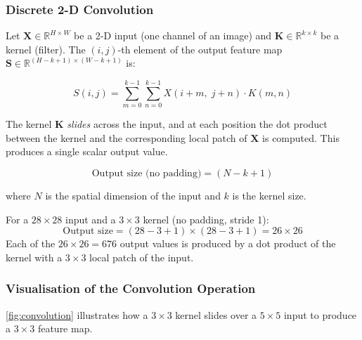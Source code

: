 \documentclass[12pt,a4paper]{article}
\begin{document}
\subsubsection{Discrete 2-D Convolution}
\label{sec:cnn_intro:convolution:math}

Let $\mathbf{X} \in \mathbb{R}^{H \times W}$ be a 2-D input (one channel
of an image) and $\mathbf{K} \in \mathbb{R}^{k \times k}$ be a kernel (filter).
The $(i,j)$-th element of the output feature map
$\mathbf{S} \in \mathbb{R}^{(H-k+1)\times(W-k+1)}$ is:

\begin{equation}
  \label{eq:convolution}
  S(i,j) = \sum_{m=0}^{k-1} \sum_{n=0}^{k-1} X(i+m,\; j+n) \cdot K(m,n)
\end{equation}

The kernel $\mathbf{K}$ \emph{slides} across the input, and at each
position the dot product between the kernel and the corresponding local
patch of $\mathbf{X}$ is computed.  This produces a single scalar output
value.

\begin{equation}
  \label{eq:output_size}
  \text{Output size (no padding)} = (N - k + 1)
\end{equation}

where $N$ is the spatial dimension of the input and $k$ is the kernel size.

\begin{example}[title=Convolution Size Example]
  For a $28 \times 28$ input and a $3 \times 3$ kernel (no padding,
  stride 1):
  \[
    \text{Output size} = (28 - 3 + 1) \times (28 - 3 + 1) = 26 \times 26
  \]
  Each of the $26\times26 = 676$ output values is produced by a dot product
  of the kernel with a $3\times3$ local patch of the input.
\end{example}

\subsubsection{Visualisation of the Convolution Operation}
\label{sec:cnn_intro:convolution:viz}

\cref{fig:convolution} illustrates how a $3\times3$ kernel slides over a
$5\times5$ input to produce a $3\times3$ feature map.
\end{document}
